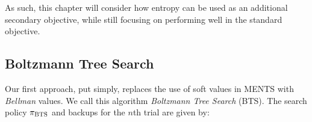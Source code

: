     As such, this chapter will consider how entropy can be used as an additional secondary objective, while still focusing on performing well in the standard objective. 
    
    \subsection{Boltzmann Tree Search}
    \label{sec:4-2-1-bts}




        Our first approach, put simply, replaces the use of soft values in MENTS with 
        \textit{Bellman} 
        values. We call this algorithm \textit{Boltzmann Tree Search} (BTS).  The search policy $\pi_{\textnormal{BTS}}$ and backups for the $n$th trial are given by:



